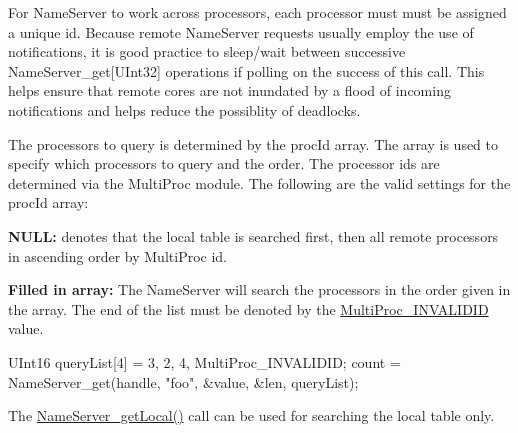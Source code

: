 For NameServer to work across processors, each processor must must be assigned a unique id. Because remote NameServer requests usually employ the use of notifications, it is good practice to sleep/wait between successive NameServer\_\-get\mbox{[}UInt32\mbox{]} operations if polling on the success of this call. This helps ensure that remote cores are not inundated by a flood of incoming notifications and helps reduce the possiblity of deadlocks.

The processors to query is determined by the procId array. The array is used to specify which processors to query and the order. The processor ids are determined via the MultiProc module. The following are the valid settings for the procId array: \begin{DoxyItemize}
\item {\bfseries NULL:} denotes that the local table is searched first, then all remote processors in ascending order by MultiProc id. \item {\bfseries Filled in array:} The NameServer will search the processors in the order given in the array. The end of the list must be denoted by the \hyperlink{_multi_proc_8h_a94a1d14527833bc8294407634d5495d9}{MultiProc\_\-INVALIDID} value.\end{DoxyItemize}

\begin{DoxyCode}
  UInt16 queryList[4] = {3, 2, 4, MultiProc_INVALIDID};
  count = NameServer_get(handle, "foo", &value, &len, queryList);
\end{DoxyCode}


The \hyperlink{_name_server_8h_a46d3826bc4ef4bc6cc45d5287c697122}{NameServer\_\-getLocal()} call can be used for searching the local table only.


